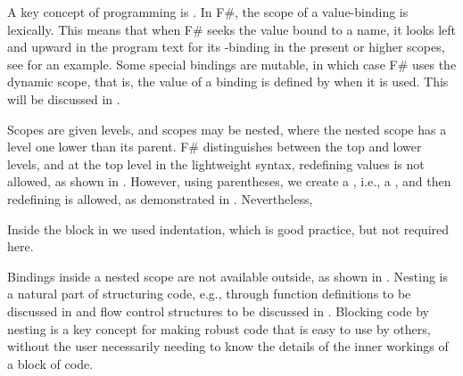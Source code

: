 A key concept of programming is . In F\#, the scope of a value-binding is lexically. This means that when F\# seeks the value bound to a name, it looks left and upward in the program text for its -binding in the present or higher scopes, see  for an example.
%
%
Some special bindings are mutable, in which case F\# uses the dynamic scope, that is, the value of a binding is defined by when it is used. This will be discussed in .

Scopes are given levels, and scopes may be nested, where the nested scope has a level one lower than its parent. F\# distinguishes between the top and lower levels, and at the top level in the lightweight syntax, redefining values is not allowed, as shown in .
%
%
However, using parentheses, we create a , i.e., a , and then redefining is allowed, as demonstrated in .
%
%
Nevertheless, 

Inside the block in  we used indentation, which is good practice, but not required here.

Bindings inside a nested scope are not available outside, as shown in .
%
%
Nesting is a natural part of structuring code, e.g., through function definitions to be discussed in  and flow control structures to be discussed in . Blocking code by nesting is a key concept for making robust code that is easy to use by others, without the user necessarily needing to know the details of the inner workings of a block of code.

